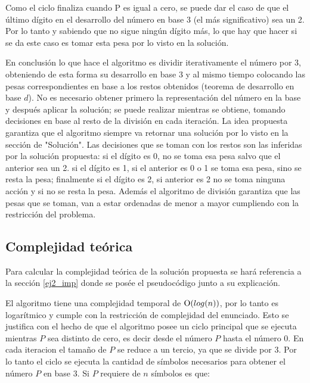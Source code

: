 	Como el ciclo finaliza cuando P es igual a cero, se puede dar el caso de que el último dígito en el desarrollo del número en base 3 (el más significativo) sea un 2. Por lo tanto y sabiendo que no sigue ningún dígito más, lo que hay que hacer si se da este caso es tomar esta pesa por lo visto en la solución.

	En conclusión lo que hace el algoritmo es dividir iterativamente el número por 3, obteniendo de esta forma su desarrollo en base 3 y al mismo tiempo colocando las pesas correspondientes en base a los restos obtenidos (teorema de desarrollo en base $d$). No es necesario obtener primero la representación del número en la base y después aplicar la solución; se puede realizar mientras se obtiene, tomando decisiones en base al resto de la división en cada iteración. La idea propuesta garantiza que el algoritmo siempre va retornar una solución por lo visto en la sección de "Solución". Las decisiones que se toman con los restos son las inferidas por la solución propuesta: si el dígito es 0, no se toma esa pesa salvo que el anterior sea un 2. si el dígito es 1, si el anterior es 0 o 1 se toma esa pesa, sino se resta la pesa; finalmente si el dígito es 2, si anterior es 2 no se toma ninguna acción y si no se resta la pesa. Además el algoritmo de división garantiza que las pesas que se toman, van a estar ordenadas de menor a mayor cumpliendo con la restricción del problema.

	\subsection{Complejidad teórica}

	Para calcular la complejidad teórica de la solución propuesta se hará
	referencia a la sección \ref{ej2_imp} donde se posée el pseudocódigo junto a
	su explicación.

	El algoritmo tiene una complejidad temporal de $\operatorname{O}(log(n))$, por lo tanto es
	logarítmico y cumple con la restricción de complejidad del enunciado. Esto se justifica con el hecho de que el algoritmo posee un ciclo
	principal que se ejecuta mientras $P$ sea distinto de cero, es decir desde el número $P$ hasta el número 0. En cada iteracion el tamaño de $P$ se reduce a un tercio, ya que se divide por 3. Por lo tanto el ciclo se ejecuta la cantidad de símbolos necesarios para obtener el número $P$ en base 3. Si $P$ requiere de $n$ símbolos es que:

